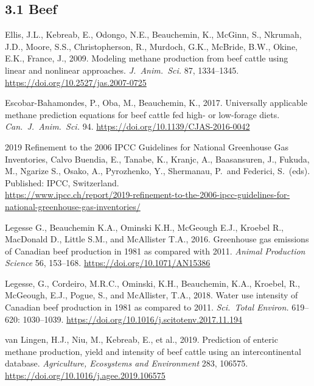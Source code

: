 \subsection*{3.1 Beef}
\begin{description}[leftmargin=0pt, style=nextline]

    \item[Ellis et al., 2009]
        Ellis, J.L., Kebreab, E., Odongo, N.E., Beauchemin, K., McGinn, S., Nkrumah,
        J.D., Moore, S.S., Christopherson, R., Murdoch, G.K., McBride, B.W., Okine,
        E.K., France, J., 2009. Modeling methane production from beef cattle using
        linear and nonlinear approaches. \textit{J.\ Anim.\ Sci.} 87, 1334--1345.
        \url{https://doi.org/10.2527/jas.2007-0725}

    \item[Escobar-Bahamondes et al., 2017]
        Escobar-Bahamondes, P., Oba, M., Beauchemin, K., 2017. Universally applicable
        methane prediction equations for beef cattle fed high- or low-forage diets.
        \textit{Can.\ J.\ Anim.\ Sci.} 94.
        \url{https://doi.org/10.1139/CJAS-2016-0042}

    \item[IPCC, 2019]
        2019 Refinement to the 2006 IPCC Guidelines for National Greenhouse Gas
        Inventories, Calvo Buendia, E., Tanabe, K., Kranjc, A., Baasansuren, J.,
        Fukuda, M., Ngarize S., Osako, A., Pyrozhenko, Y., Shermanau, P.\ and
        Federici, S.\ (eds). Published: IPCC, Switzerland.\\
        \url{https://www.ipcc.ch/report/2019-refinement-to-the-2006-ipcc-guidelines-for-national-greenhouse-gas-inventories/}

    \item[Legesse et al., 2016]
        Legesse G., Beauchemin K.A., Ominski K.H., McGeough E.J., Kroebel R.,
        MacDonald D., Little S.M., and McAllister T.A., 2016. Greenhouse gas emissions
        of Canadian beef production in 1981 as compared with 2011.
        \textit{Animal Production Science} 56, 153--168.
        \url{https://doi.org/10.1071/AN15386}

    \item[Legesse et al., 2018]
        Legesse, G., Cordeiro, M.R.C., Ominski, K.H., Beauchemin, K.A., Kroebel, R.,
        McGeough, E.J., Pogue, S., and McAllister, T.A., 2018. Water use intensity of
        Canadian beef production in 1981 as compared to 2011.
        \textit{Sci.\ Total Environ.} 619--620: 1030--1039.
        \url{https://doi.org/10.1016/j.scitotenv.2017.11.194}

    \item[van Lingen et al., 2019]
        van Lingen, H.J., Niu, M., Kebreab, E., et al., 2019. Prediction of enteric
        methane production, yield and intensity of beef cattle using an intercontinental
        database. \textit{Agriculture, Ecosystems and Environment} 283, 106575.
        \url{https://doi.org/10.1016/j.agee.2019.106575}

\end{description}

